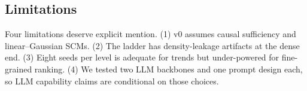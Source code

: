 \subsection{Limitations}

Four limitations deserve explicit mention. (1) v0 assumes causal sufficiency and linear--Gaussian SCMs. (2) The ladder has density-leakage artifacts at the dense end. (3) Eight seeds per level is adequate for trends but under-powered for fine-grained ranking. (4) We tested two LLM backbones and one prompt design each, so LLM capability claims are conditional on those choices.
